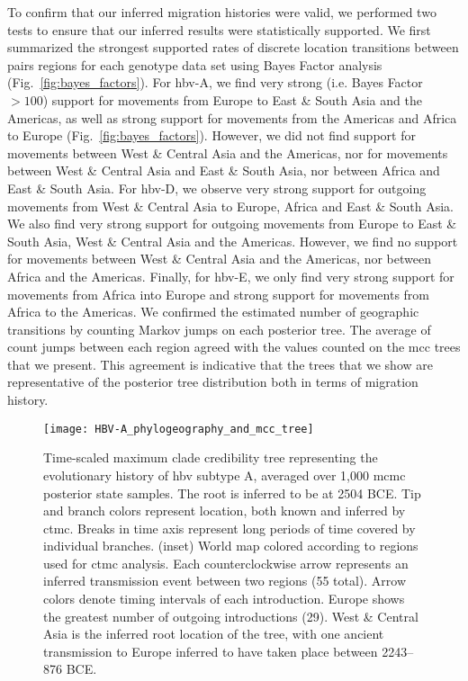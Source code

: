To confirm that our inferred migration histories were valid, we performed two tests to ensure that our inferred results were statistically supported.
We first summarized the strongest supported rates of discrete location transitions between pairs regions for each genotype data set using Bayes Factor analysis (Fig.~\ref{fig:bayes_factors}).
For \gls{hbv}-A, we find very strong (i.e. Bayes Factor $>100$) support for movements from Europe to East \& South Asia and the Americas, as well as strong support for movements from the Americas and Africa to Europe (Fig.~\ref{fig:bayes_factors}).
However, we did not find support for movements between West \& Central Asia and the Americas, nor for movements between West \& Central Asia and East \& South Asia, nor between Africa and East \& South Asia.
For \gls{hbv}-D, we observe very strong support for outgoing movements from West \& Central Asia to Europe, Africa and East \& South Asia.
We also find very strong support for outgoing movements from Europe to East \& South Asia, West \& Central Asia and the Americas.
However, we find no support for movements between West \& Central Asia and the Americas, nor between Africa and the Americas.
Finally, for \gls{hbv}-E, we only find very strong support for movements from Africa into Europe and strong support for movements from Africa to the Americas.
We confirmed the estimated number of geographic transitions by counting Markov jumps on each posterior tree.
The average of count jumps between each region agreed with the values counted on the \gls{mcc} trees that we present.
This agreement is indicative that the trees that we show are representative of the posterior tree distribution both in terms of migration history.

\begin{figure}[ht]
  \centering
  \medskip
  \texttt{[image: HBV-A\_phylogeography\_and\_mcc\_tree]}
  \caption[HBV-A phylogeography ]{Time-scaled maximum clade credibility tree representing the evolutionary history of \gls{hbv} subtype A, averaged over 1,000 \gls{mcmc} posterior state samples. The root is inferred to be at 2504 BCE. Tip and branch colors represent location, both known and inferred by \gls{ctmc}. Breaks in time axis represent long periods of time covered by individual branches. (inset) World map colored according to regions used for \gls{ctmc} analysis. Each counterclockwise arrow represents an inferred transmission event between two regions (55 total). Arrow colors denote timing intervals of each introduction. Europe shows the greatest number of outgoing introductions (29). West \& Central Asia is the inferred root location of the tree, with one ancient transmission to Europe inferred to have taken place between 2243--876 BCE.}
  \label{fig:HBV-A_phylogeo}
\end{figure}

